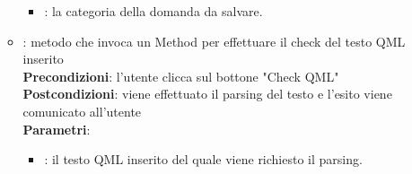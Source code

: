 \begin{itemize}
\begin{itemize}
\begin{itemize}
				\item{}: la categoria della domanda da salvare.\\
			\end{itemize}
			\item{}: metodo che invoca un Method per effettuare il check del testo QML inserito\\
		\textbf{Precondizioni}: l'utente clicca sul bottone "Check QML"\\
		\textbf{Postcondizioni}: viene effettuato il parsing del testo e l'esito viene comunicato all'utente\\
		\textbf{Parametri}:
			\begin{itemize}
				\item{}: il testo QML inserito del quale viene richiesto il parsing.\\
			\end{itemize}
	\end{itemize}
\end{itemize}

